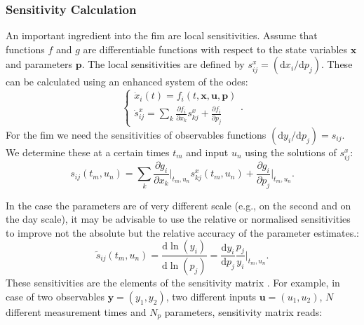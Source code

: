 \documentclass[10pt,A4paper]{article}
\newcommand{\mbx}{\mathbf{x}}
\newcommand{\mbu}{\mathbf{u}}
\newcommand{\mbp}{\mathbf{p}}
\newcommand{\mby}{\mathbf{y}}
\begin{document}
%
\subsubsection*{Sensitivity Calculation}
An important ingredient into the \ac{fim} are local sensitivities.
Assume that functions $f$ and $g$ are differentiable functions with respect to the state variables $\mbx$ and parameters $\mbp$.
The local sensitivities are defined by $s^x_{ij} = (\mathrm{d} x_i / \mathrm{d} p_j )$.
These can be calculated using an enhanced system of the \acp{ode}:
\begin{equation}
    \begin{cases}
    \dot x_i (t) = f_i(t, \mbx, \mbu, \mbp)\\
    \dot s^x_{ij} = \sum_k \frac{\partial f_i}{\partial x_k} s^x_{kj} + \frac{\partial f_i}{\partial p_j}
    \end{cases}.
\label{eq:ode_and_sensitiv}
\end{equation} 
For the \ac{fim} we need the sensitivities of observables functions $(\mathrm{d} y_i / \mathrm{d} p_j) = s_{ij}$.
We determine these at a certain times $t_m$ and input $u_n$ using the solutions of $s^x_{ij}$:
\begin{equation}
    s_{ij} (t_m, u_n) = \sum_k \frac{\partial g_i}{\partial x_k}\bigg|_{t_m, u_n} s_{kj}^x (t_m, u_n) + \frac{\partial g_i}{\partial p_j}\bigg|_{t_m, u_n}.
\label{eq:observ_sensitivities}
\end{equation}

In the case the parameters are of very different scale (e.g., on the second and on the day scale), it may be advisable to use the relative or normalised sensitivities to improve not the absolute but the relative accuracy of the parameter estimates.:
\begin{equation}
    \tilde{s}_{ij} (t_m, u_n) =\frac{\mathrm{d}\ln(y_i)}{\mathrm{d}\ln(p_j)} = \frac{\mathrm{d} y_i}{\mathrm{d} p_j} \frac{p_j}{y_i}\bigg|_{t_m, u_n}.
\label{eq:relat_sensitivities}
\end{equation}
These sensitivities are the elements of the sensitivity matrix \cite{stigterObservabilityComplex2017}.
For example, in case of two observables $\mby = (y_1, y_2)$, two different inputs $\mbu = (u_1, u_2)$, $N$ different measurement times and $N_p$ parameters, sensitivity matrix reads:
\end{document}
